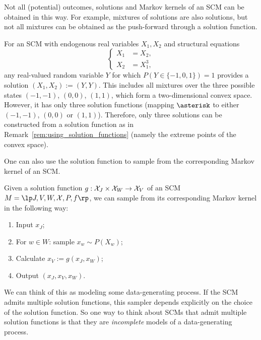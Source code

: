 Not all (potential) outcomes, solutions and Markov kernels of an SCM can be obtained in this way. 
For example, mixtures of solutions are also solutions, but not all mixtures can be obtained as the push-forward through a solution function.
\begin{Eg}\label{eg:not_each_solution_from_push_forward}
For an SCM with endogenous real variables $X_1,X_2$ and structural equations 
$$\begin{cases}
  X_1 &= X_2,\\
  X_2 &= X_1^3,
\end{cases}$$
any real-valued random variable $Y$ for which $P(Y \in \{-1,0,1\}) = 1$
provides a solution $(X_1,X_2) := (Y,Y)$. This includes all mixtures over the three
possible states $(-1,-1)$, $(0,0)$, $(1,1)$, which form a two-dimensional convex
space. However, it has only three solution functions (mapping $\asterisk$ to
either $(-1,-1)$, $(0,0)$ or $(1,1)$).
Therefore, only three solutions can be constructed from a solution function as in Remark~\ref{rem:using_solution_functions} (namely the extreme points of the convex space).
\end{Eg}

One can also use the solution function to sample from the corresponding Markov kernel of an SCM. 
\begin{Rem}
  Given a solution function $g : \mathcal{X}_{J} \times \mathcal{X}_{W} \to \mathcal{X}_{V}$ of an SCM $M = \lt \Sin, \Send, \Srnd, \CX, P, f \rt$,
  we can sample from its corresponding Markov kernel in the following way:
\begin{enumerate}
  \item Input $x_J$;
  \item For $w \in W$: sample $x_w \sim P(X_w)$;
  \item Calculate $x_{V} := g(x_J,x_W)$;
  \item Output $(x_J,x_V,x_W)$.
\end{enumerate}
\end{Rem}
We can think of this as modeling some data-generating process.
If the SCM admits multiple solution functions, this sampler depends explicitly on the choice of the solution function.
So one way to think about SCMs that admit multiple solution functions is that they are \emph{incomplete} models of a data-generating process.

